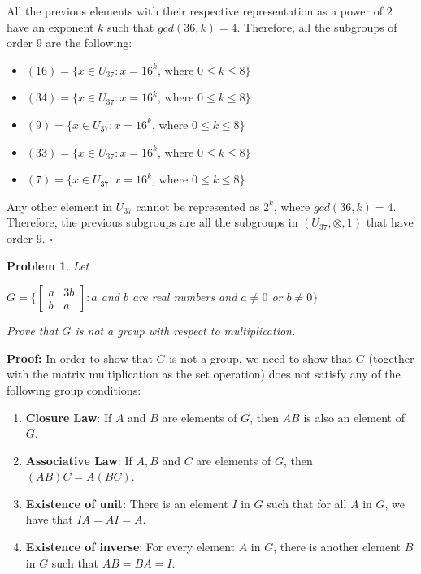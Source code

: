 \documentclass[a4paper,openany,11pt]{book}
\newtheorem{Prob}{Problem}
\begin{document}
All the previous elements with their respective representation as a power of $2$ have an exponent $k$ such that $gcd(36,k) = 4$. Therefore, all the subgroups of order $9$ are the following:

\begin{itemize}
	\item $(16) = \lbrace x \in U_{37}: x = 16^{k}$, where $0 \leq k \leq 8 \rbrace$
	
	\item $(34) = \lbrace x \in U_{37}: x = 16^{k}$, where $0 \leq k \leq 8 \rbrace$
	
	\item $(9) = \lbrace x \in U_{37}: x = 16^{k}$, where $0 \leq k \leq 8 \rbrace$
	
	\item $(33) = \lbrace x \in U_{37}: x = 16^{k}$, where $0 \leq k \leq 8 \rbrace$
	
	\item $(7) = \lbrace x \in U_{37}: x = 16^{k}$, where $0 \leq k \leq 8 \rbrace$
\end{itemize}

Any other element in $U_{37}$ cannot be represented as $2^{k}$, where $gcd(36,k) = 4$. Therefore, the previous subgroups are all the subgroups in $(U_{37}, \otimes, 1)$ that have order $9$. \hspace{0.1cm} $\square$

\begin{Prob}
	Let
	
	\begin{center}
		$G = \biggl\{\left[\begin{array}{cc}
		a & 3b\\
		b & a
		\end{array}\right] : a$ and $b$ are real numbers and $a\neq 0$ or $b \neq 0\biggr\} $
	\end{center}

	Prove that $G$ is not a group with respect to multiplication.

\end{Prob}

\textbf{Proof:} In order to show that $G$ is not a group, we need to show that $G$ (together with the matrix multiplication as the set operation) does not satisfy any of the following group conditions:

\begin{enumerate}
	\item \textbf{Closure Law}: If $A$ and $B$ are elements of $G$, then $AB$ is also an element of $G$. 
	
	\item \textbf{Associative Law}: If $A, B$ and $C$ are elements of $G$, then $(AB)C = A(BC)$.
	
	\item \textbf{Existence of unit}: There is an element $I$ in $G$ such that for all $A$ in $G$, we have that $IA = AI = A$.
	
	\item \textbf{Existence of inverse}: For every element $A$ in $G$, there is another element $B$ in $G$ such that $AB = BA = I$.
\end{enumerate} 
\end{document}
